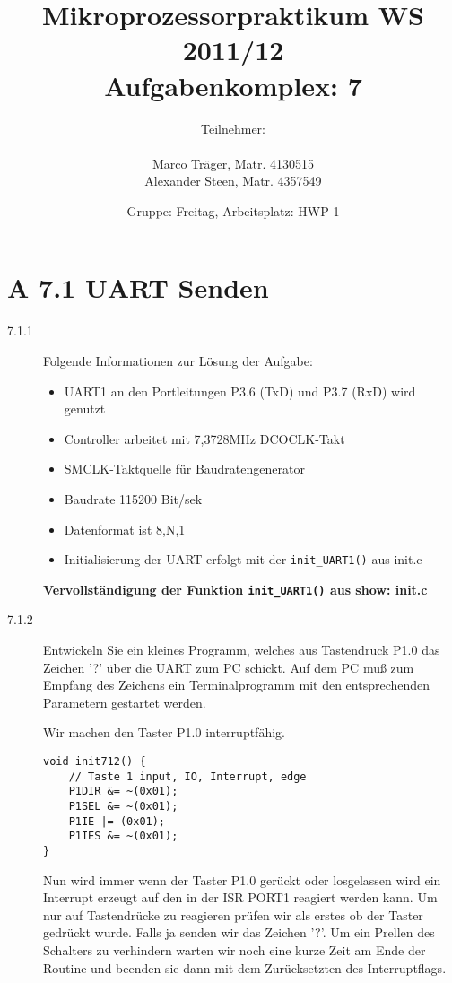 \documentclass[11pt,a4paper,ngerman]{article}
\author{Teilnehmer:\\ \\Marco Träger, Matr. 4130515\\Alexander Steen, Matr. 4357549}
\date{Gruppe: Freitag, Arbeitsplatz: HWP 1}
\title{Mikroprozessorpraktikum WS 2011/12\\ Aufgabenkomplex: 7}
\begin{document}

\maketitle
\thispagestyle{fancy}
\newpage
\section*{A 7.1 UART Senden}

\begin{description}
\item[7.1.1] Folgende Informationen zur Lösung der Aufgabe:
	\begin{itemize}
		\item UART1 an den Portleitungen P3.6 (TxD) und P3.7 (RxD) wird genutzt
		\item Controller arbeitet mit 7,3728MHz DCOCLK-Takt
		\item SMCLK-Taktquelle für Baudratengenerator
		\item Baudrate 115200 Bit/sek 
		\item Datenformat ist 8,N,1
		\item Initialisierung der UART erfolgt mit der \lstinline|init_UART1()| aus init.c
	\end{itemize}
	
	\textbf{Vervollständigung der Funktion \lstinline|init_UART1()| aus show: init.c}
	
	

\item[7.1.2] Entwickeln Sie ein kleines Programm, welches aus Tastendruck P1.0 das Zeichen '?' über die UART zum PC schickt. Auf dem PC muß zum Empfang des Zeichens ein Terminalprogramm mit den entsprechenden Parametern gestartet werden.

Wir machen den Taster P1.0 interruptfähig.
\begin{lstlisting}
void init712() {
    // Taste 1 input, IO, Interrupt, edge
    P1DIR &= ~(0x01);
    P1SEL &= ~(0x01);
    P1IE |= (0x01);
    P1IES &= ~(0x01);
}
\end{lstlisting}

Nun wird immer wenn der Taster P1.0 gerückt oder losgelassen wird ein Interrupt erzeugt auf den
in der ISR PORT1 reagiert werden kann. Um nur auf Tastendrücke zu reagieren
prüfen wir als erstes ob der Taster gedrückt wurde. Falls ja senden wir das Zeichen '?'.
Um ein Prellen des Schalters zu verhindern warten wir noch eine kurze Zeit am Ende der Routine und
beenden sie dann mit dem Zurücksetzten des Interruptflags.


\end{description}
\end{document}
